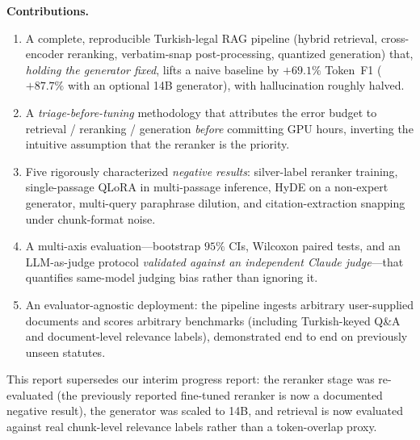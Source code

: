 \documentclass[conference]{IEEEtran}
\newcommand{\best}[1]{\textbf{#1}}
\begin{document}
\noindent\textbf{Contributions.}
\begin{enumerate}
\item A complete, reproducible Turkish-legal RAG pipeline (hybrid
retrieval, cross-encoder reranking, verbatim-snap post-processing, quantized
generation) that, \emph{holding the generator fixed}, lifts a naive baseline by
\best{$+69.1\%$} Token~F1 ($+87.7\%$ with an optional 14B generator), with
hallucination roughly halved.
\item A \emph{triage-before-tuning} methodology that attributes the error
budget to retrieval / reranking / generation \emph{before} committing GPU
hours, inverting the intuitive assumption that the reranker is the priority.
\item Five rigorously characterized \emph{negative results}: silver-label
reranker training, single-passage QLoRA in multi-passage inference, HyDE on a
non-expert generator, multi-query paraphrase dilution, and citation-extraction
snapping under chunk-format noise.
\item A multi-axis evaluation---bootstrap $95\%$ CIs, Wilcoxon paired tests,
and an LLM-as-judge protocol \emph{validated against an independent Claude
judge}---that quantifies same-model judging bias rather than ignoring it.
\item An evaluator-agnostic deployment: the pipeline ingests arbitrary
user-supplied documents and scores arbitrary benchmarks (including
Turkish-keyed Q\&A and document-level relevance labels), demonstrated end to
end on previously unseen statutes.
\end{enumerate}

This report supersedes our interim progress report: the reranker stage was
re-evaluated (the previously reported fine-tuned reranker is now a documented
negative result), the generator was scaled to 14B, and retrieval is now
evaluated against real chunk-level relevance labels rather than a token-overlap
proxy.

\end{document}
